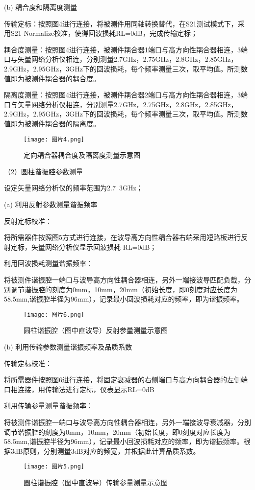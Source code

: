 \documentclass[UTF8]{ctexart}
\begin{document}
(b) 耦合度和隔离度测量

传输定标：按照图4进行连接，将被测件用同轴转换替代，在S21测试模式下，采用S21 Normalize校准，使得回波损耗RL=0dB，完成传输定标；

耦合度测量：按照图4进行连接，被测件耦合器1端口与高方向性耦合器相连，3端口与矢量网络分析仪相连，分别测量2.7GHz，2.75GHz，2.8GHz，2.85GHz，2.9GHz，2.95GHz，3GHz下的回波损耗，每个频率测量三次，取平均值。所测数值即为被测件耦合器的耦合度。

隔离度测量：按照图4进行连接，被测件耦合器2端口与高方向性耦合器相连，3端口与矢量网络分析仪相连，分别测量2.7GHz，2.75GHz，2.8GHz，2.85GHz，2.9GHz，2.95GHz，3GHz下的回波损耗，每个频率测量三次，取平均值。所测数值即为被测件耦合器的隔离度。
\begin{figure}[!htp]
    \centering
    \texttt{[image: 图片4.png]}
    \caption{定向耦合器耦合度及隔离度测量示意图}
\end{figure}

（2）圆柱谐振腔参数测量

设定矢量网络分析仪的频率范围为2.7~3GHz；

(a) 利用反射参数测量谐振频率

反射定标校准：

将所需器件按照图5方式进行连接，在波导高方向性耦合器右端采用短路板进行反射定标，矢量网络分析仪显示回波损耗 RL=0dB；

利用回波损耗测量谐振频率：

将被测件谐振腔一端口与波导高方向性耦合器相连，另外一端接波导匹配负载，分别调节谐振腔的刻度为0mm，10mm，20mm（初始长度，即0刻度对应长度为58.5mm,谐振腔半径为96mm），记录最小回波损耗对应的频率，即为谐振频率。
\begin{figure}[!htp]
    \centering
    \texttt{[image: 图片6.png]}
    \caption{圆柱谐振腔（图中直波导）反射参量测量示意图}
\end{figure}

(b) 利用传输参数测量谐振频率及品质系数

传输定标校准：

将所需器件按照图6进行连接，将固定衰减器的右侧端口与高方向耦合器的左侧端口相连接，用传输法进行定标，仪表显示RL=0dB

利用传输参量测量谐振频率：

将被测件谐振腔一端口与波导高方向性耦合器相连，另外一端接波导衰减器，分别调节谐振腔的刻度为0mm，10mm，20mm（初始长度，即0刻度对应长度为58.5mm,谐振腔半径为96mm），记录最小回波损耗对应的频率，即为谐振频率。根据3dB原则，分别测量3dB对应的频宽，并根据此计算品质系数。
\begin{figure}[!htp]
    \centering
    \texttt{[image: 图片5.png]}
    \caption{圆柱谐振腔（图中直波导）传输参量测量示意图}
\end{figure}
\end{document}
